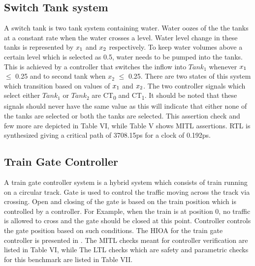 {\begin{table}[]
{\begin{tabular}{ |p{0.3cm}|p{3.3cm}|p{3.3cm}|p{3 cm}|p{1.1cm}|p{0.5cm}|p{0.5cm}|}
		
		\hline
		
		
		
		
	
		
	\end{tabular}}
\end{table}
\subsection{Switch Tank system }
	A switch tank is two tank system \citep{Lygeros1999} containing water. Water oozes of the the tanks at a constant rate when the water crosses a level. Water level change  in these tanks is represented by $x\textsubscript{1}$ and $x\textsubscript{2}$ respectively. To keep water volumes above a certain level which is selected as 0.5, water needs to be pumped into the tanks. This is achieved by a controller that switches the inflow into $Tank_{1}$ whenever $x\textsubscript{1}$ $\le$ 0.25 and to second tank when   $x_{2}$ $\le$ 0.25.
	There are two states of this system which transition based on values of $x\textsubscript{1}$ and $x\textsubscript{2}$.
	 The two controller signals which select either $Tank_{1}$ or $Tank_{2}$ are CT\textsubscript{0} and CT\textsubscript{1}. It should be noted that these signals should never have the same value as this will indicate that either none of the tanks are selected or both the tanks are selected. This assertion check and few more are depicted in Table VI, while Table V shows MITL assertions. RTL is synthesized giving a critical path of 3708.15ps for a clock of 0.192ps.
\subsection{Train Gate Controller}
A train gate controller system is a hybrid system  \citep{Brennon2013} which consists of train running on a circular track. Gate is used to control the traffic moving across the track via crossing. Open and closing of the gate is based on the train position which is controlled by a controller. For Example, when the train is at position 0, no traffic is allowed to cross and the gate should be closed at this point. Controller controls the gate position based on such conditions.
The HIOA for the train gate controller is presented in \citep{malik2018emulation}. The MITL checks meant for controller verification are listed in Table VI, while The LTL checks which are safety and parametric checks for this benchmark are listed in Table VII.
}
